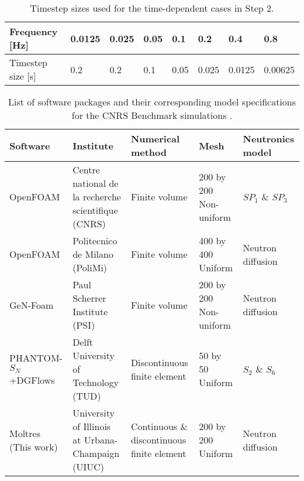 \begin{table}[tb]
    \caption{Timestep sizes used for the time-dependent cases in
    Step 2.}
    \footnotesize
	\centering
	\setlength\tabcolsep{2.5pt}
	\begin{tabular}{l l l l l l l l}
	    \toprule
	    Frequency [Hz] & 0.0125 & 0.025 & 0.05 & 0.1 & 0.2 & 0.4 & 0.8 \\
	    \midrule
	    Timestep size [s] & 0.2 & 0.2 & 0.1 & 0.05 & 0.025 & 0.0125 & 0.00625
	    \\
	    \bottomrule
	\end{tabular}
	\label{table:timestep}
\end{table}
%
\begin{table*}[tb]
    \caption{List of software packages and their corresponding model
    specifications for the CNRS Benchmark simulations
    \citep{tiberga_results_2020}.}
    \footnotesize
    \centering
    \begin{tabular}{l p{4cm} p{3cm} p{1.7cm} l}
        \toprule
        Software & Institute & Numerical method & Mesh & Neutronics model \\
        \midrule
        OpenFOAM & Centre national de la recherche scientifique (CNRS) & Finite volume & 200 by 200 \newline Non-uniform & $SP_1$ \& $SP_3$ \\
        OpenFOAM & Politecnico de Milano (PoliMi) & Finite volume & 400 by 400 \newline Uniform & Neutron diffusion \\
        GeN-Foam & Paul Scherrer Institute (PSI) & Finite volume & 200 by 200 \newline Non-uniform & Neutron diffusion \\
        PHANTOM-$S_N$+DGFlows & Delft University of Technology (TUD) & Discontinuous finite \newline element & 50 by 50 \newline Uniform & $S_2$ \& $S_6$ \\
        Moltres (This work) & University of Illinois at Urbana-Champaign (UIUC) & Continuous \& discontinuous finite element & 200 by 200 \newline Uniform & Neutron diffusion \\
        \bottomrule
    \end{tabular}
    \label{table:software}
\end{table*}